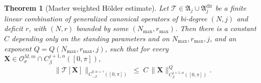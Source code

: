 \documentclass{amsart}
\newtheorem{theorem}{Theorem}[section]
\begin{document}
\begin{theorem}[Master weighted Hölder estimate]\label{thm:master_estimate}
Let $\mathcal{T} \in \mathfrak{A}_j \cup \mathfrak{A}_j^{\mathrm{dir}}$ be a finite linear combination of generalized canonical operators of bi-degree $(N, j)$ and deficit $r$, with $(N, r)$ bounded by some $(N_{\max}, r_{\max})$.  Then there is a constant $C$ depending only on the standing parameters and on $N_{\max}, r_{\max}, j$, and an exponent $Q = Q(N_{\max}, r_{\max}, j)$, such that for every $\mathbf{X} \in \mathcal{O}^{M,m}_\sigma \cap C^{j+1,\alpha}_\beta([0,\pi])$,
\begin{equation}\label{eq:master_estimate}
\bigl\|\mathcal{T}[\mathbf{X}]\bigr\|_{C^{0,\alpha+\gamma}_{-\beta}([0,\pi])}
 \;\le\; C\, \|\mathbf{X}\|_{C^{j+1,\alpha}_\beta([0,\pi])}^{Q}.
\end{equation}
\end{theorem}
\end{document}
